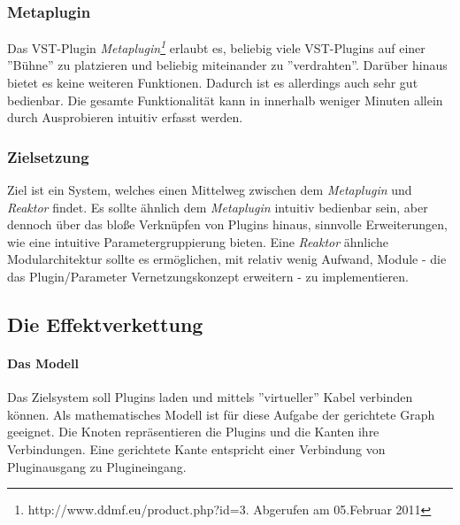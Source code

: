 \subsubsection{Metaplugin}
Das VST-Plugin \emph{Metaplugin\footnote{http://www.ddmf.eu/product.php?id=3. Abgerufen am 05.Februar 2011}} erlaubt es, beliebig viele VST-Plugins auf einer ''Bühne'' zu platzieren und beliebig miteinander zu ''verdrahten''. Darüber hinaus bietet es keine weiteren Funktionen. Dadurch ist es allerdings auch sehr gut bedienbar. Die gesamte Funktionalität kann in innerhalb weniger Minuten allein durch Ausprobieren intuitiv erfasst werden.
\subsubsection{Zielsetzung}
Ziel ist ein System, welches einen Mittelweg zwischen dem \emph{Metaplugin} und \emph{Reaktor} findet. Es sollte ähnlich dem \emph{Metaplugin} intuitiv bedienbar sein, aber dennoch über das bloße Verknüpfen von Plugins hinaus, sinnvolle Erweiterungen, wie eine intuitive Parametergruppierung bieten. Eine \emph{Reaktor} ähnliche Modularchitektur sollte es ermöglichen, mit relativ wenig Aufwand, Module - die das Plugin/Parameter Vernetzungskonzept erweitern - zu implementieren.
\subsection{Die Effektverkettung}
\paragraph{Das Modell}
Das Zielsystem soll Plugins laden und mittels ''virtueller'' Kabel verbinden können. Als mathematisches Modell ist für diese Aufgabe der gerichtete Graph geeignet. Die Knoten repräsentieren die Plugins und die Kanten ihre Verbindungen. Eine gerichtete Kante entspricht einer Verbindung von Pluginausgang zu Plugineingang. 
